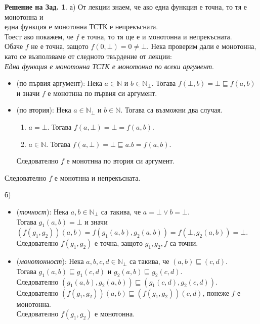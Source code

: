\documentclass[a4paper,9pt]{extarticle}
\theoremstyle{definition}
\newtheorem{solution}{Решение на Зад.}
\newcommand{\Nat}{\mathbb{N}}
\begin{document}
\begin{solution}
а) От лекции знаем, че ако една функция е точна, то тя е монотонна и \\
една функция е монотонна ТСТК е непрекъсната. \\
Тоест ако покажем, че $f$ е точна, то тя ще е и монотонна и непрекъсната. \\
Обаче $f$ не е точна, защото $f(0, \bot) = 0 \neq \bot$.
Нека проверим дали е монотонна, \\
като се възползваме от следното твърдение от лекции: \\
\textit{Една функция е монотонна ТСТК е монотонна по всеки аргумент}.
\begin{itemize}
    \item (по първия аргумент): Нека $a \in \Nat$ и $b \in \Nat_\bot$. Тогава $f(\bot, b) = \bot \sqsubseteq f(a, b)$ \\
    и значи $f$ е монотнна по първия си аргумент.
    \item (по втория): Нека $a \in \Nat_\bot$ и $b \in \Nat$. Тогава са възможни два случая.
    \begin{enumerate}
        \item $a = \bot$. Тогава $f(a, \bot) = \bot = f(a, b)$.
        \item $a \in \Nat$. Тогава $f(a, \bot) = \bot \sqsubseteq a.b = f(a, b)$.
    \end{enumerate}
    Следователно $f$ е монотнна по втория си аргумент.
\end{itemize}
Следователно $f$ е монотнна и непрекъсната.

\vskip9pt

б) \begin{itemize}
    \item (\textit{точност}): Нека $a, b \in \Nat_\bot$ са такива, че $a = \bot \lor b = \bot$. \\
    Тогава $g_1(a, b) = \bot$ и значи $(f(g_1, g_2))(a, b) = f(g_1(a, b), g_2(a, b)) = f(\bot, g_2(a, b)) = \bot$. \\
    Следователно $f(g_1, g_2)$ е точна, защото $g_1, g_2, f$ са точни.
    \item (\textit{монотонност}): Нека $a, b, c, d \in \Nat_\bot$ са такива, че $(a, b) \sqsubseteq (c, d)$. \\
    Тогава $g_1(a, b) \sqsubseteq g_1(c, d)$ и  $g_2(a, b) \sqsubseteq g_2(c, d)$. \\
    Следователно $(g_1(a, b), g_2(a, b)) \sqsubseteq (g_1(c, d), g_2(c, d))$. \\
    Следователно $(f(g_1, g_2))(a, b) \sqsubseteq (f(g_1, g_2))(c, d)$, понеже $f$ е монотонна. \\
    Следователно $f(g_1, g_2)$ е монотонна.
\end{itemize}
\end{solution}
\end{document}

